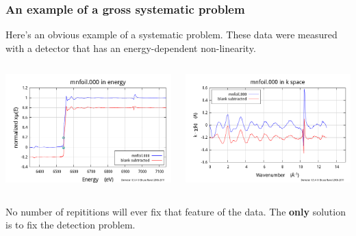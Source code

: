 \documentclass[10pt, xcolor=x11names, compress]{beamer}
\begin{document}
\begin{frame}
  \frametitle{An example of a gross systematic problem}

  Here's an obvious example of a systematic problem.  These data were
  measured with a detector that has an energy-dependent non-linearity.

  \begin{columns}[T]
    \begin{column}{0.5\linewidth}
      \includegraphics[width=\linewidth]{images/mnxmu.png}      
    \end{column}
    \begin{column}{0.5\linewidth}
      \includegraphics[width=\linewidth]{images/mnchik.png}      
    \end{column}
  \end{columns}

  \bigskip

  \begin{alertblock}{}
    No number of repititions will ever fix that feature of the data.
    The \textbf{only} solution is to fix the detection problem.
  \end{alertblock}
\end{frame}
\end{document}
